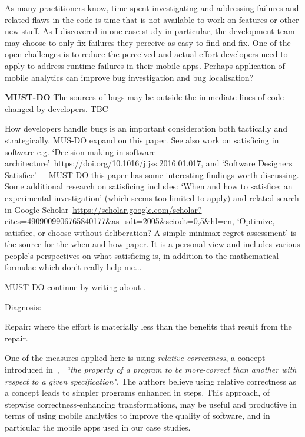 
As many practitioners know, time spent investigating and addressing failures and related flaws in the code is time that is not available to work on features or other new stuff. As I discovered in one case study in particular, the development team may choose to only fix failures they perceive as easy to find and fix. One of the open challenges is to reduce the perceived and actual effort developers need to apply to address runtime failures in their mobile apps. 
%
Perhaps application of mobile analytics can improve bug investigation and bug localisation? 

\textbf{MUST-DO} The sources of bugs may be outside the immediate lines of code changed by developers. TBC~

How developers handle bugs is an important consideration both tactically and strategically. \textcite{lopez2021_bumps_in_the_code_error_handling_during_software_development} MUS-DO expand on this paper. See also work on satisficing in software e.g. `Decision making in software architecture'~\url{https://doi.org/10.1016/j.jss.2016.01.017}, and `Software Designers Satisfice'~ - MUST-DO this paper has some interesting findings worth discussing. 
%
Some additional research on satisficing includes: `When and how to satisfice: an experimental investigation' (which seems too limited to apply) and related search in Google Scholar~\url{https://scholar.google.com/scholar?cites=4909009906765840177&as_sdt=2005&sciodt=0,5&hl=en}, `Optimize, satisfice, or choose without deliberation? A simple minimax-regret assessment' is the source for the when and how paper. It is a personal view and includes various people's perspectives on what satisficing is, in addition to the mathematical formulae which don't really help me...



MUST-DO continue by writing about .


Diagnosis:

Repair: where the effort is materially less than the benefits that result from the repair. 


One of the measures applied here is using \emph{relative correctness}, a concept introduced in~, ~\emph{``the
property of a program to be more-correct than another with respect to a given specification"}. The authors believe using relative correctness as a concept leads to simpler programs enhanced  in steps. This approach, of stepwise correctness-enhancing transformations, may be useful and productive in terms of using mobile analytics to improve the quality of software, and in particular the mobile apps used in our case studies. 

